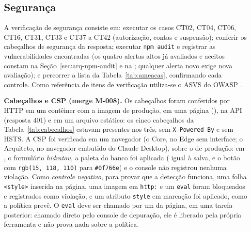

\subsection{Segurança}\label{sec:testes-seguranca}

A verificação de segurança consiste em: executar os casos CT02, CT04, CT06, CT16, CT31, CT33 e CT37 a CT42 (autorização, contas e suspensão); conferir os cabeçalhos de segurança da resposta; executar \texttt{npm audit} e registrar as vulnerabilidades encontradas (os quatro alertas altos já avaliados e aceitos constam na Seção~\ref{sec:arq-npm-audit} e na ; qualquer alerta novo exige nova avaliação); e percorrer a lista da Tabela~\ref{tab:ameacas}, confirmando cada controle. Como referência de itens de verificação utiliza-se o ASVS do OWASP \cite{owaspasvs}.

\textbf{Cabeçalhos e CSP (merge M-008).} Os cabeçalhos foram conferidos por HTTP em um contêiner com a imagem de produção, em uma página (), na API (resposta 401) e em um arquivo estático: os cinco cabeçalhos da Tabela~\ref{tab:cabecalhos} estavam presentes nos três, sem \texttt{X-Powered-By} e sem HSTS. A CSP foi verificada em um navegador (o Core, no Edge sem interface; o Arquiteto, no navegador embutido do Claude Desktop), sobre o  de produção: em , o formulário \emph{hidratou}, a paleta do banco foi aplicada ( igual à salva, e o botão com \texttt{rgb(15, 118, 110)} para \texttt{\#0f766e}) e o console não registrou nenhuma violação. Como \emph{controle negativo}, para provar que a detecção funciona, uma folha \texttt{<style>} inserida na página, uma imagem em \texttt{http:} e um \texttt{eval} foram bloqueados e registrados como violação, e um atributo \texttt{style} em marcação foi aplicado, como a política prevê. O \texttt{eval} deve ser chamado por um  da página, em uma tarefa posterior: chamado direto pelo console de depuração, ele é liberado pela própria ferramenta e não prova nada sobre a política.

